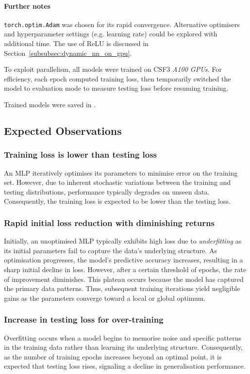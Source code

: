 \documentclass{article}
\begin{document}
\paragraph{Further notes}
\texttt{torch.optim.Adam} was chosen for its rapid convergence. Alternative optimisers and hyperparameter settings (e.g. learning rate) could be explored with additional time. The use of ReLU is discussed in Section~\ref{subsubsec:dynamic_nn_on_gpu}. 

To exploit parallelism, all models were trained on CSF3 \textit{A100 GPUs}. For efficiency, each epoch computed training loss, then temporarily switched the model to evaluation mode to measure testing loss before resuming training. 

Trained models were saved in . 


\subsection{Expected Observations}


\subsubsection{Training loss is lower than testing loss}
An MLP iteratively optimises its parameters to minimise error on the training set. However, due to inherent stochastic variations between the training and testing distributions, performance typically degrades on unseen data. Consequently, the training loss is expected to be lower than the testing loss. 


\subsubsection{Rapid initial loss reduction with diminishing returns}
Initially, an unoptimised MLP typically exhibits high loss due to \textit{underfitting} as its initial parameters fail to capture the data's underlying structure. As optimisation progresses, the model's predictive accuracy increases, resulting in a sharp initial decline in loss. However, after a certain threshold of epochs, the rate of improvement diminishes. This plateau occurs because the model has captured the primary data patterns. Thus, subsequent training iterations yield negligible gains as the parameters converge toward a local or global optimum. 


\subsubsection{Increase in testing loss for over-training}
Overfitting occurs when a model begins to memorise noise and specific patterns in the training data rather than learning its underlying structure. Consequently, as the number of training epochs increases beyond an optimal point, it is expected that testing loss rises, signaling a decline in generalisation performance. 
\end{document}
